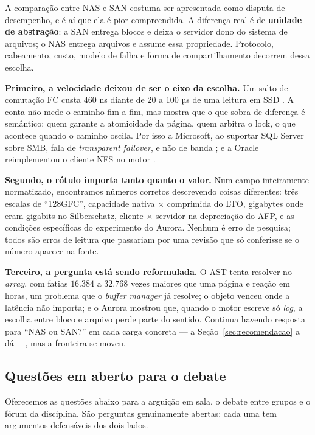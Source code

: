 \documentclass[11pt,a4paper]{article}
\begin{document}
A comparação entre NAS e SAN costuma ser apresentada como disputa de desempenho, e é aí que ela é pior
compreendida. A diferença real é de \textbf{unidade de abstração}: a SAN entrega blocos e deixa o servidor
dono do sistema de arquivos; o NAS entrega arquivos e assume essa propriedade. Protocolo, cabeamento,
custo, modelo de falha e forma de compartilhamento decorrem dessa escolha.

\textbf{Primeiro, a velocidade deixou de ser o eixo da escolha.} Um salto de comutação FC custa 460 ns
\cite{brocadeg710} diante de 20 a 100 µs de uma leitura em SSD \cite{silberschatz2020}. A conta não mede o
caminho fim a fim, mas mostra que o que sobra de diferença é semântico: quem garante a atomicidade da
página, quem arbitra o lock, o que acontece quando o caminho oscila. Por isso a Microsoft, ao suportar SQL
Server sobre SMB, fala de \textit{transparent failover}, e não de banda \cite{mssqlsmb}; e a Oracle
reimplementou o cliente NFS no motor \cite{oracledn}.

\textbf{Segundo, o rótulo importa tanto quanto o valor.} Num campo inteiramente normatizado, encontramos
números corretos descrevendo coisas diferentes: três escalas de ``128GFC'', capacidade nativa × comprimida
do LTO, gigabytes onde eram gigabits no Silberschatz, cliente × servidor na depreciação do AFP, e as
condições específicas do experimento do Aurora. Nenhum é erro de pesquisa; todos são erros de leitura que
passariam por uma revisão que só conferisse se o número aparece na fonte.

\textbf{Terceiro, a pergunta está sendo reformulada.} O AST tenta resolver no \textit{array}, com fatias
$16.384$ a $32.768$ vezes maiores que uma página e reação em horas, um problema que o \textit{buffer
manager} já resolve; o objeto venceu onde a latência não importa; e o Aurora mostrou que, quando o motor
escreve só \textit{log}, a escolha entre bloco e arquivo perde parte do sentido. Continua havendo resposta
para ``NAS ou SAN?'' em cada carga concreta --- a Seção~\ref{sec:recomendacao} a dá ---, mas a fronteira se
moveu.

\subsection{Questões em aberto para o debate}
\label{sec:debate}

Oferecemos as questões abaixo para a arguição em sala, o debate entre grupos e o fórum da disciplina. São
perguntas genuinamente abertas: cada uma tem argumentos defensáveis dos dois lados.
\end{document}
